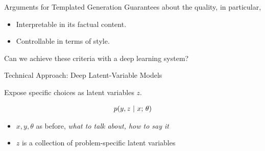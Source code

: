 







\begin{frame}{Arguments for Templated Generation}
Guarantees about the quality, in particular,
\air


\begin{itemize}
\item Interpretable in its factual content.
  \air


  \air

\item Controllable in terms of style.
  \air



\end{itemize}

\begin{center}
  Can we achieve these criteria with a deep learning system?
\end{center}
\end{frame}


\begin{frame}{Technical Approach: Deep Latent-Variable Models}

  Expose specific choices as latent variables $z$.


\begin{align*}
p(y, z\ |\ x ; \, \theta)
\end{align*}

\begin{itemize}
    \item $x, y, \theta$ as before, \textit{what to talk about, how to say it}
    \item $z$ is a collection of problem-specific latent variables
\end{itemize}



\end{frame}

